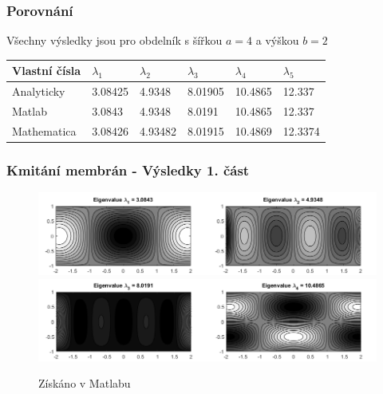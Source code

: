 \documentclass[xcolor=table]{beamer}
\begin{document}
\begin{frame}
\frametitle{Porovnání}
Všechny výsledky jsou pro obdelník s šířkou $a=4$ a výškou $b=2$

\begin{table}[]
\begin{tabular}{|llllll|}
\hline
\rowcolor[HTML]{EFEFEF} 
\cellcolor[HTML]{C0C0C0}Vlastní čísla & $\lambda_1$      & $\lambda_2$        & $\lambda_3$    & $\lambda_4$    & $\lambda_5$     \\ \hline
\rowcolor[HTML]{CBCEFB} 
\cellcolor[HTML]{9698ED}Analyticky    & 3.08425 & 4.9348  & 8.01905 & 10.4865 & 12.337  \\ \hline
\rowcolor[HTML]{FFCE93} 
\cellcolor[HTML]{FE996B}Matlab        & 3.0843  & 4.9348  & 8.0191  & 10.4865 & 12.337  \\ \hline
\rowcolor[HTML]{FFCCC9} 
\cellcolor[HTML]{FD6864}Mathematica   & 3.08426 & 4.93482 & 8.01915 & 10.4869 & 12.3374 \\ \hline
\end{tabular}
\end{table}

\end{frame}

\begin{frame}
\frametitle{Kmitání membrán - Výsledky 1. část}
\centering
\begin{figure}
\includegraphics[width=1\linewidth]{obdelnicky1.png}
\includegraphics[width=1\linewidth]{obdelnicky2.png}
\caption{Získáno v Matlabu}
\end{figure}
\end{frame}
\end{document}
